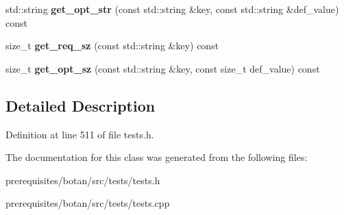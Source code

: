 \begin{DoxyCompactItemize}
\item 
\mbox{\label{class_botan___tests_1_1_var_map_a8bf3936112906b552da71ea97cc237c3}} 
std\+::string {\bfseries get\+\_\+opt\+\_\+str} (const std\+::string \&key, const std\+::string \&def\+\_\+value) const
\item 
\mbox{\label{class_botan___tests_1_1_var_map_ae1e97844898954242f31ebce2f438ea9}} 
size\+\_\+t {\bfseries get\+\_\+req\+\_\+sz} (const std\+::string \&key) const
\item 
\mbox{\label{class_botan___tests_1_1_var_map_aa19d8208d0c47f0ee55629c6c418a635}} 
size\+\_\+t {\bfseries get\+\_\+opt\+\_\+sz} (const std\+::string \&key, const size\+\_\+t def\+\_\+value) const
\end{DoxyCompactItemize}


\subsection{Detailed Description}


Definition at line 511 of file tests.\+h.



The documentation for this class was generated from the following files\+:\begin{DoxyCompactItemize}
\item 
prerequisites/botan/src/tests/tests.\+h\item 
prerequisites/botan/src/tests/tests.\+cpp\end{DoxyCompactItemize}
